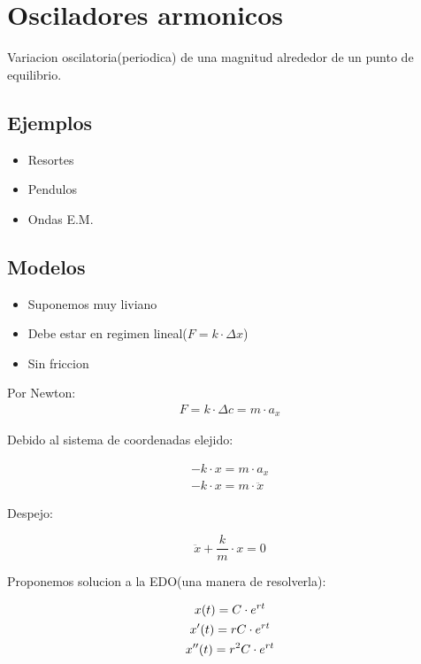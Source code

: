 
\section{Osciladores armonicos}

\begin{definition}
    Variacion oscilatoria(periodica) de una magnitud alrededor de un punto de equilibrio.
\end{definition}

\subsection{Ejemplos}
\begin{itemize}
	\item Resortes
	\item Pendulos
	\item Ondas E.M.
\end{itemize}

\subsection{Modelos}
\begin{itemize}
	\item Suponemos muy liviano
	\item Debe estar en regimen lineal($F=k \cdot \Delta x$)
	\item Sin friccion
\end{itemize}

Por Newton:
\begin{gather}
	\nonumber F = k \cdot \Delta c = m \cdot a_x
\end{gather}

Debido al sistema de coordenadas elejido:

\begin{gather}
	\nonumber -k \cdot x = m \cdot a_x \\
	\nonumber -k \cdot x = m \cdot \ddot{x}
\end{gather}

Despejo:

\[
	\ddot{x} + \frac{k}{m} \cdot x = 0
\]

Proponemos solucion a la EDO(una manera de resolverla):

\begin{gather}
	\nonumber x(t)=C \cdot e^{rt} \\
	\nonumber x'(t)=rC \cdot e^{rt} \\
	\nonumber x''(t)=r^2C \cdot e^{rt}
\end{gather}

